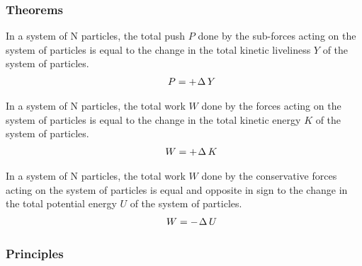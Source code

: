\documentclass[10pt,fleqn]{article}
\newcommand{\mY}{Y}
\newcommand{\mK}{K}
\newcommand{\mP}{P}
\newcommand{\mW}{W}
\newcommand{\mU}{U}
\begin{document}
\newpage

{\centering\subsubsection*{Theorems}}

\vspace{+1.20em}

\par In a system of N particles, the total push $\mP$ done by the sub-forces acting on the system of particles is equal to the change in the total kinetic liveliness $\mY$ of the system of particles.
\begin{eqnarray*}
\hspace{+1.50em} \mP = + \hspace{+0.09em} \Delta \hspace{+0.18em} \mY
\end{eqnarray*}
\par In a system of N particles, the total work $\mW$ done by the forces acting on the system of particles is equal to the change in the total kinetic energy $\mK$ of the system of particles.
\begin{eqnarray*}
\hspace{+1.50em} \mW = + \hspace{+0.09em} \Delta \hspace{+0.18em} \mK
\end{eqnarray*}
\par In a system of N particles, the total work $\mW$ done by the conservative forces acting on the system of particles is equal and opposite in sign to the change in the total potential energy $\mU$ of the system of particles.
\begin{eqnarray*}
\hspace{+1.50em} \mW = - \hspace{+0.09em} \Delta \hspace{+0.18em} \mU
\end{eqnarray*}

\vspace{+0.90em}

{\centering\subsubsection*{Principles}}

\vspace{+1.20em}
\end{document}
